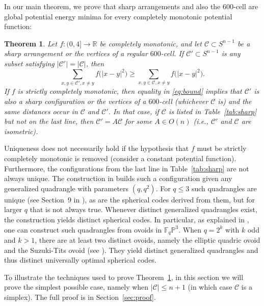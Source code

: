 \documentclass{jams-l}
\theoremstyle{plain}
\newtheorem{theorem}{Theorem}
\numberwithin{theorem}{section}
\theoremstyle{definition}
\numberwithin{equation}{section}
\newcommand{\R}{{\mathbb R}}
\newcommand{\F}{{\mathbb F}}
\newcommand{\Proj}{{\mathbb P}}
\newcommand{\CodeS}{\mathcal{C}}
\newcommand{\CodeT}{\mathcal{C}'}
\newcommand{\co}{\colon}
\begin{document}
In our main theorem, we prove that sharp arrangements and also the
$600$-cell are global potential energy minima for every completely
monotonic potential function:

\begin{theorem} \label{theorem:main}
Let $f \co (0,4] \to \R$ be completely monotonic, and let $\CodeS
\subset S^{n-1}$ be a sharp arrangement or the vertices of a
regular $600$-cell. If $\CodeT \subset S^{n-1}$ is any subset
satisfying $|\CodeT|=|\CodeS|$, then
\begin{equation}
\label{eq:bound} \sum_{x,y \in \CodeT, x \ne y} f\big(|x-y|^2\big)
\ge \sum_{x,y \in \CodeS, x \ne y} f\big(|x-y|^2\big).
\end{equation}
If $f$ is strictly completely monotonic, then equality in
\eqref{eq:bound} implies that $\CodeT$ is also a sharp
configuration or the vertices of a $600$-cell (whichever $\CodeS$
is) and the same distances occur in $\CodeS$ and $\CodeT$. In that
case, if $\CodeS$ is listed in Table~\ref{tab:sharp} but not on
the last line, then $\CodeT = A\CodeS$ for some $A \in O(n)$
(i.e., $\CodeT$ and $\CodeS$ are isometric).
\end{theorem}

Uniqueness does not necessarily hold if the hypothesis that $f$
must be strictly completely monotonic is removed (consider a
constant potential function).  Furthermore, the configurations
from the last line in Table~\ref{tab:sharp} are not always unique.
The construction in \cite{CGS} builds such a configuration given
any generalized quadrangle with parameters $(q,q^2)$.  For $q \le
3$ such quadrangles are unique (see Section~9 in \cite{CGS}), as
are the spherical codes derived from them, but for larger $q$ that
is not always true. Whenever distinct generalized quadrangles
exist, the construction yields distinct spherical codes.  In
particular, as explained in \cite{CGS}, one can construct such
quadrangles from ovoids in $\F_q\Proj^3$.  When $q=2^k$ with $k$
odd and $k>1$, there are at least two distinct ovoids, namely the
elliptic quadric ovoid and the Suzuki-Tits ovoid (see \cite{T}).
They yield distinct generalized quadrangles and thus distinct
universally optimal spherical codes.

To illustrate the techniques used to prove
Theorem~\ref{theorem:main}, in this section we will prove the
simplest possible case, namely when $|\CodeS| \le n+1$ (in which
case $\CodeS$ is a simplex). The full proof is in
Section~\ref{sec:proof}.
\end{document}
